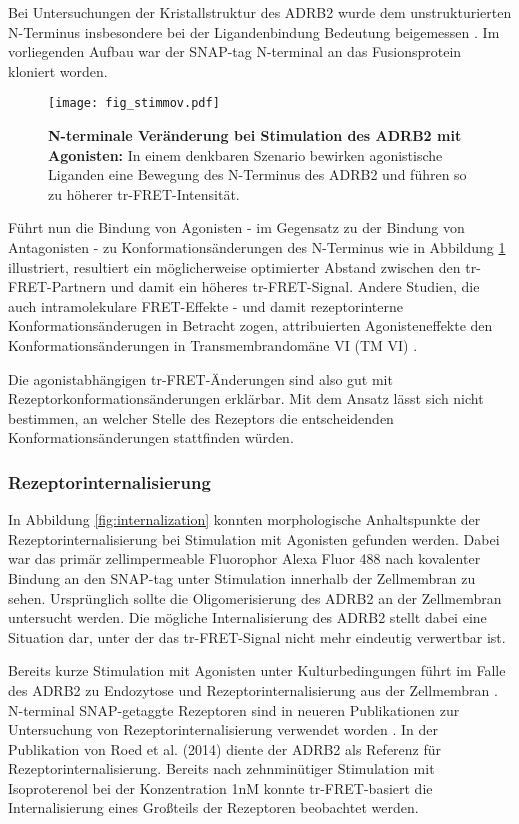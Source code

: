 Bei Untersuchungen der Kristallstruktur des ADRB2 wurde dem unstrukturierten N-Terminus insbesondere bei der Ligandenbindung Bedeutung beigemessen \parencite{Cherezov2007}. Im vorliegenden Aufbau war der SNAP-tag N-terminal an das Fusionsprotein kloniert worden. 


\begin{figure}[htbp]
	\centering
    \texttt{[image: fig\_stimmov.pdf]}
    \caption{\textbf{N-terminale Veränderung bei Stimulation des ADRB2 mit Agonisten:} In einem denkbaren Szenario bewirken agonistische Liganden eine Bewegung des N-Terminus des ADRB2 und führen so zu höherer tr-FRET-Intensität.} 
    \label{fig:stimmov}
\end{figure}

Führt nun die Bindung von Agonisten - im Gegensatz zu der Bindung von Antagonisten - zu Konformationsänderungen des N-Terminus wie in Abbildung \ref{fig:stimmov} illustriert, resultiert ein möglicherweise optimierter Abstand zwischen den tr-FRET-Partnern und damit ein höheres tr-FRET-Signal. Andere Studien, die auch intramolekulare FRET-Effekte - und damit rezeptorinterne Konformationsänderugen in Betracht zogen, attribuierten Agonisteneffekte den Konformationsänderungen in Transmembrandomäne VI (TM VI) \parencite{Fung2009, Latif2002, Zhu2002}.

Die agonistabhängigen tr-FRET-Änderungen sind also gut mit Rezeptorkonformationsänderungen erklärbar. Mit dem Ansatz lässt sich nicht bestimmen, an welcher Stelle des Rezeptors die entscheidenden Konformationsänderungen stattfinden würden. 

\subsubsection{Rezeptorinternalisierung}
In Abbildung \ref{fig:internalization} konnten morphologische Anhaltspunkte der Rezeptorinternalisierung bei Stimulation mit Agonisten gefunden werden. Dabei war das primär zellimpermeable Fluorophor Alexa Fluor 488 nach kovalenter Bindung an den SNAP-tag unter Stimulation innerhalb der Zellmembran zu sehen. Ursprünglich sollte die Oligomerisierung des ADRB2 an der Zellmembran untersucht werden. Die mögliche Internalisierung des ADRB2 stellt dabei eine Situation dar, unter der das tr-FRET-Signal nicht mehr eindeutig verwertbar ist. 

Bereits kurze Stimulation mit Agonisten unter Kulturbedingungen führt im Falle des ADRB2 zu Endozytose und Rezeptorinternalisierung aus der Zellmembran \parencite{VonZastrow1994}. N-terminal SNAP-getaggte Rezeptoren sind in neueren Publikationen zur Untersuchung von Rezeptorinternalisierung verwendet worden \parencite{Roed2014}. In der Publikation von Roed et al. (2014) diente der ADRB2 als Referenz für Rezeptorinternalisierung. Bereits nach zehnminütiger Stimulation mit Isoproterenol bei der Konzentration 1\si{\nano M} konnte tr-FRET-basiert die Internalisierung eines Großteils der Rezeptoren beobachtet werden.

